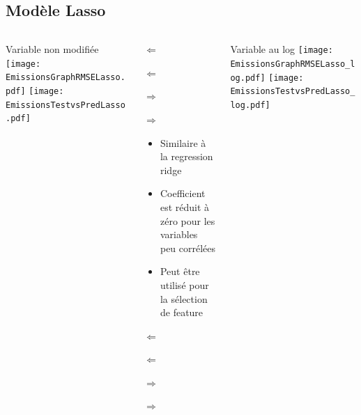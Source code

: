 \documentclass[8pt,aspectratio=169,hyperref={unicode=true}]{beamer}
\begin{document}
\subsection{Modèle Lasso}
\begin{frame}{\insertsubsection}
  \begin{columns}[t]
    \begin{column}{.33\textwidth}
      \centering Variable non modifiée
      \texttt{[image: EmissionsGraphRMSELasso.pdf]}
      \texttt{[image: EmissionsTestvsPredLasso.pdf]}
    \end{column}
    \begin{column}{.33\textwidth}
      $\Longleftarrow$

      {\footnotesize
          }

      \raggedright
      $\Longleftarrow$

      \raggedleft
      $\Longrightarrow$

      {\footnotesize
          }

      \raggedleft
      $\Longrightarrow$

      \raggedright
      \begin{itemize}
        \item Similaire à la regression ridge
        \item Coefficient est réduit à zéro pour les variables peu corrélées
        \item Peut être utilisé pour la sélection de feature
      \end{itemize}

      $\Longleftarrow$
      {\scriptsize \centering
          }

      $\Longleftarrow$

      \raggedleft
      $\Longrightarrow$

      {\scriptsize \centering
          
        }
      \raggedleft
      $\Longrightarrow$

    \end{column}
    \begin{column}{.33\textwidth}
      \centering Variable au log
      \texttt{[image: EmissionsGraphRMSELasso\_log.pdf]}
      \texttt{[image: EmissionsTestvsPredLasso\_log.pdf]}
    \end{column}
  \end{columns}
\end{frame}
\end{document}
